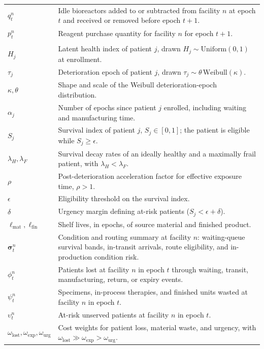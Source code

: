 \documentclass[preprint,review,12pt]{elsarticle}
\begin{document}
\begin{table}[htbp]
\begin{tabularx}{\textwidth}{>{\raggedright\arraybackslash}p{} >{\raggedright\arraybackslash}X}
$q_t^n$ & Idle bioreactors added to or subtracted from facility $n$ at epoch $t$ and received or removed before epoch $t+1$. \\
$p_t^n$ & Reagent purchase quantity for facility $n$ for epoch $t+1$. \\
\midrule
\multicolumn{2}{c}{\textbf{Patient-condition and perishability}} \\
\midrule
$H_j$ & Latent health index of patient $j$, drawn $H_j \sim \mathrm{Uniform}(0,1)$ at enrollment. \\
$\tau_j$ & Deterioration epoch of patient $j$, drawn $\tau_j \sim \theta\,\mathrm{Weibull}(\kappa)$. \\
$\kappa,\theta$ & Shape and scale of the Weibull deterioration-epoch distribution. \\
$\alpha_j$ & Number of epochs since patient $j$ enrolled, including waiting and manufacturing time. \\
$S_j$ & Survival index of patient $j$, $S_j \in [0,1]$; the patient is eligible while $S_j \ge \epsilon$. \\
$\lambda_H,\lambda_F$ & Survival decay rates of an ideally healthy and a maximally frail patient, with $\lambda_H < \lambda_F$. \\
$\rho$ & Post-deterioration acceleration factor for effective exposure time, $\rho > 1$. \\
$\epsilon$ & Eligibility threshold on the survival index. \\
$\delta$ & Urgency margin defining at-risk patients ($S_j < \epsilon + \delta$). \\
$\ell_{\mathrm{mat}},\ell_{\mathrm{fin}}$ & Shelf lives, in epochs, of source material and finished product. \\
$\boldsymbol{\sigma}_t^n$ & Condition and routing summary at facility $n$: waiting-queue survival bands, in-transit arrivals, route eligibility, and in-production condition risk. \\
$\phi_t^n$ & Patients lost at facility $n$ in epoch $t$ through waiting, transit, manufacturing, return, or expiry events. \\
$\psi_t^n$ & Specimens, in-process therapies, and finished units wasted at facility $n$ in epoch $t$. \\
$\upsilon_t^n$ & At-risk unserved patients at facility $n$ in epoch $t$. \\
$\omega_{\mathrm{lost}},\omega_{\mathrm{exp}},\omega_{\mathrm{urg}}$ & Cost weights for patient loss, material waste, and urgency, with $\omega_{\mathrm{lost}} \gg \omega_{\mathrm{exp}} > \omega_{\mathrm{urg}}$. \\
\bottomrule
\end{tabularx}
\end{table}
\end{document}
